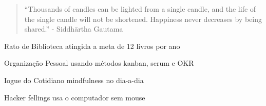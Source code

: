 
\begin{quote}
“Thousands of candles can be lighted from a single candle, and the life of the single candle will not be shortened. Happiness never decreases by being shared.” - Siddhārtha Gautama
\end{quote}








\cvachievement{\faTrophy}
              {Rato de Biblioteca}
              {atingida a meta de 12 livros por ano}

\divider

\cvachievement{\faHeartbeat}
              {Organização Pessoal}
              {usando métodos kanban, scrum e OKR}

\divider
 
\cvachievement{\faHeartbeat}
              {Iogue do Cotidiano}
              {mindfulness no dia-a-dia}

\divider

\cvachievement{\faTrophy}
              {Hacker fellings}
              {usa o computador sem mouse}



\medskip






